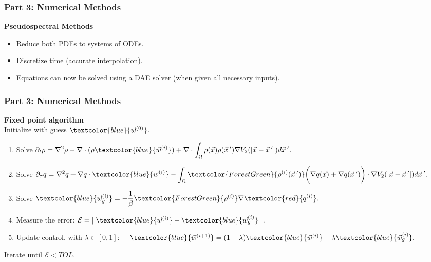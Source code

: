 \documentclass[aspectratio=169,xcolor=dvipsnames]{beamer}
\begin{document}
\begin{frame}
	\frametitle{Part 3: Numerical Methods}
	\textbf{Pseudospectral Methods}\\
	\vspace{0.3 cm}
    \begin{itemize}
    	\item Reduce both PDEs to systems of ODEs.
    	\item Discretize time (accurate interpolation).
    	\item Equations can now be solved using a DAE solver (when given all necessary inputs).
    \end{itemize}
	
\end{frame}


\begin{frame}
	\frametitle{Part 3: Numerical Methods}
\textbf{Fixed point algorithm}\\
\vspace{0.4 cm}
Initialize with guess $\textcolor{blue}{\vec{w}^{(0)}}$.
	\begin{enumerate}
     \item 
     Solve $\displaystyle \partial_t \rho  = \nabla^2 \rho  - \nabla \cdot (\rho \textcolor{blue}{\vec{w}^{(i)}} )
     + \nabla \cdot \int_\Omega \rho(\vec{x}) \rho(\vec{x}\hspace{0.2em}') \nabla V_2(|\vec{x}-\vec{x}\hspace{0.2em}'|)d\vec{x}\hspace{0.2em}'. 
     $
	 \item
     Solve $\displaystyle \partial_{{\tau}} q  = \nabla^2 q  + \nabla q  \cdot \textcolor{blue}{\vec{w}^{(i)}}  
     - \int_\Omega \textcolor{ForestGreen}{\rho^{(i)}(\vec{x}\hspace{0.2em}')} \bigg(\nabla q( \vec{x} ) + \nabla q( \vec{x}\hspace{0.2em}')\bigg) \cdot \nabla V_2(|\vec{x}-\vec{x}\hspace{0.2em}'|)d\vec{x}\hspace{0.2em}'. 
     $
     \item Solve $\displaystyle \textcolor{blue}{\vec{w}^{(i)}_g} = - \frac{1}{\beta}\textcolor{ForestGreen}{{\rho}^{(i)}} \nabla \textcolor{red}{{q}^{(i)}}.$
     \vspace{0.4 cm}
     \item Measure the error: $ \mathcal{E} = ||\textcolor{blue}{\vec{w}^{(i)}} - \textcolor{blue}{\vec{w}^{(i)}_g}||$.
     \vspace{0.2 cm}
	 \item Update control, with $\lambda \in [0,1]$:       $\quad \textcolor{blue}{\vec{w}^{(i+1)}} = (1-\lambda)\textcolor{blue}{\vec{w}^{(i)}} + \lambda \textcolor{blue}{\vec{w}^{(i)}_g}.$	 
	\end{enumerate}	
\vspace{0.2 cm}
Iterate until $\mathcal{E} <TOL$.
\end{frame}
\end{document}
